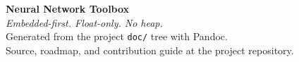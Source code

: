 \cleardoublepage
\thispagestyle{empty}
\vspace*{\fill}
\begin{center}
{\Large\bfseries\color{RoyalBlue} Neural Network Toolbox}\\[0.5em]
{\itshape Embedded-first. Float-only. No heap.}\\[2em]
Generated from the project \texttt{doc/} tree with Pandoc.\\
Source, roadmap, and contribution guide at the project repository.
\end{center}
\vspace*{\fill}
